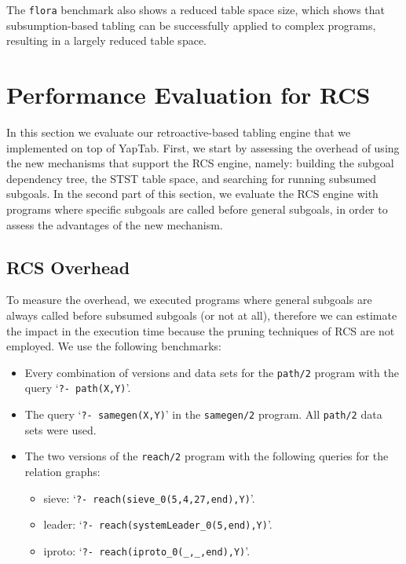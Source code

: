 The \texttt{flora} benchmark also shows a reduced table space size, which shows that subsumption-based
tabling can be successfully applied to complex programs, resulting in a largely reduced
table space.



\section{Performance Evaluation for RCS}

In this section we evaluate our retroactive-based tabling engine that we implemented on
top of YapTab. First, we start by assessing the overhead of using the new mechanisms that
support the RCS engine, namely: building the subgoal dependency tree, the STST table space,
and searching for running subsumed subgoals. In the second part of this section, we evaluate
the RCS engine with programs where specific subgoals are called before general subgoals, in
order to assess the advantages of the new mechanism.

\subsection{RCS Overhead}

To measure the overhead, we executed programs where general subgoals are always called before
subsumed subgoals (or not at all), therefore we can estimate the impact in the execution time
because the pruning techniques of RCS are not employed.
We use the following benchmarks:

\begin{itemize}
   \item Every combination of versions and data sets for the \texttt{path/2} program with the query `\texttt{?-~path(X,Y)}'.
   
   \item The query `\texttt{?-~samegen(X,Y)}' in the \texttt{samegen/2} program. All \texttt{path/2} data
   sets were used.
   
   \item The two versions of the \texttt{reach/2} program with the following queries for the relation graphs:

   \begin{itemize}
      \item sieve: `\texttt{?-~reach(sieve\_0(5,4,27,end),Y)}'.
      \item leader: `\texttt{?-~reach(systemLeader\_0(5,end),Y)}'.
      \item iproto: `\texttt{?-~reach(iproto\_0(\_,\_,end),Y)}'.
   \end{itemize}
\end{itemize}


